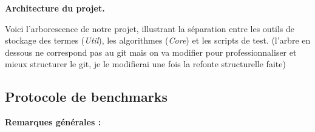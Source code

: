 \documentclass[11pt]{article}
\newenvironment{paraph}[1]{%
  \medskip
  \noindent\textbf{#1.}\quad

  \vspace{0.2cm}
}{%
  \medskip
}
\begin{document}
\begin{paraph}{Architecture du projet}
    Voici l'arborescence de notre projet, illustrant la séparation entre les outils de stockage des termes (\textit{Util}), les algorithmes (\textit{Core}) et les scripts de test. 
    (l'arbre en dessous ne correspond pas au git mais on va modifier pour professionnaliser et mieux
    structurer le git, je le modifierai une fois la refonte structurelle faite)  
\end{paraph}

\subsection{Protocole de benchmarks}
\textbf{ Remarques générales :}
\end{document}
